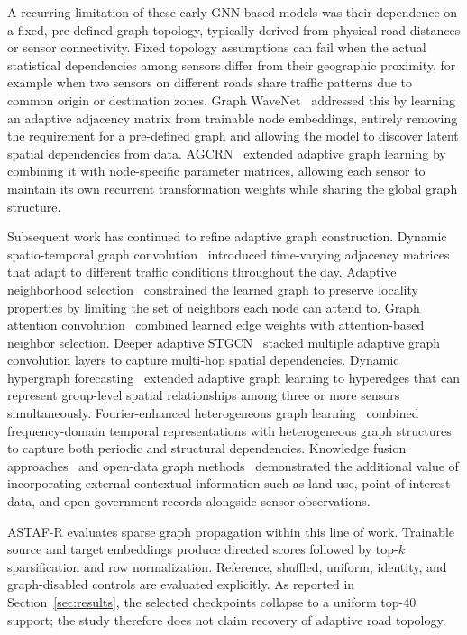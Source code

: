 \documentclass[fleqn,10pt]{wlscirep}
\newenvironment{changedcontent}{\color{changeblue}}{}
\begin{document}
A recurring limitation of these early GNN-based models was their
dependence on a fixed, pre-defined graph topology, typically derived
from physical road distances or sensor connectivity. Fixed topology
assumptions can fail when the actual statistical dependencies among
sensors differ from their geographic proximity, for example when two
sensors on different roads share traffic patterns due to common origin
or destination zones. Graph WaveNet~\cite{wu2019graphwavenet}
addressed this by learning an adaptive adjacency matrix from trainable
node embeddings, entirely removing the requirement for a pre-defined
graph and allowing the model to discover latent spatial dependencies
from data. AGCRN~\cite{bai2020agcrn} extended adaptive graph learning
by combining it with node-specific parameter matrices, allowing each
sensor to maintain its own recurrent transformation weights while
sharing the global graph structure.

Subsequent work has continued to refine adaptive graph construction.
Dynamic spatio-temporal graph convolution~\cite{shao2022dmstgcn}
introduced time-varying adjacency matrices that adapt to different
traffic conditions throughout the day. Adaptive neighborhood
selection~\cite{sun2024stgnnans} constrained the learned graph to
preserve locality properties by limiting the set of neighbors each
node can attend to. Graph attention
convolution~\cite{liu2024stgacn} combined learned edge weights with
attention-based neighbor selection. Deeper adaptive
STGCN~\cite{cui2023adstgcn} stacked multiple adaptive graph
convolution layers to capture multi-hop spatial dependencies.
Dynamic hypergraph forecasting~\cite{ye2024hypergraphtraffic} extended
adaptive graph learning to hyperedges that can represent group-level
spatial relationships among three or more sensors simultaneously.
Fourier-enhanced heterogeneous graph
learning~\cite{zhao2024fourierhetero} combined frequency-domain
temporal representations with heterogeneous graph structures to
capture both periodic and structural dependencies. Knowledge fusion
approaches~\cite{zhou2024knowledgefusion} and open-data graph
methods~\cite{brimos2023opengov} demonstrated the additional value
of incorporating external contextual information such as land use,
point-of-interest data, and open government records alongside sensor
observations.

\begin{changedcontent}
ASTAF-R evaluates sparse graph propagation within this line of work. Trainable
source and target embeddings produce directed scores followed by top-$k$
sparsification and row normalization. Reference, shuffled, uniform, identity,
and graph-disabled controls are evaluated explicitly. As reported in
Section~\ref{sec:results}, the selected checkpoints collapse to a uniform
top-40 support; the study therefore does not claim recovery of adaptive road
topology.
\end{changedcontent}
\end{document}
